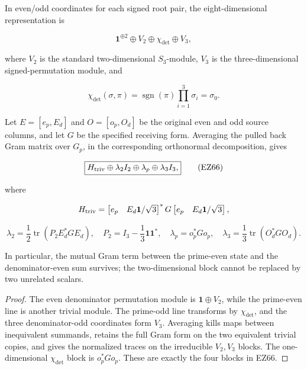 \begin{corollary}
\label{cor:fixed-input-metric}
In even/odd coordinates for each signed root pair, the eight-dimensional
representation is

\begin{equation}
 \mathbf1^{\oplus2}\oplus V_2\oplus\chi_{\det}\oplus V_3,       \tag{EZ65}
\end{equation}

where \(V_2\) is the standard two-dimensional \(S_3\)-module,
\(V_3\) is the three-dimensional signed-permutation module, and

\[
 \chi_{\det}(\sigma,\pi)
 =\operatorname{sgn}(\pi)\prod_{i=1}^3\sigma_i=\sigma_0.
\]

Let \(E=[e_p,E_d]\) and \(O=[o_p,O_d]\) be the original even and odd source
columns, and let \(G\) be the specified receiving form.  Averaging the pulled
back Gram matrix over \(G_p\), in the corresponding orthonormal decomposition,
gives

\begin{equation}
 \boxed{H_{\rm triv}\oplus\lambda_2I_2\oplus\lambda_p
 \oplus\lambda_3I_3,}                                \tag{EZ66}
\end{equation}

where

\[
 H_{\rm triv}=
 \begin{bmatrix}e_p&E_d\mathbf1/\sqrt3\end{bmatrix}^{*}G
 \begin{bmatrix}e_p&E_d\mathbf1/\sqrt3\end{bmatrix},
\]

\[
 \lambda_2=\frac12\operatorname{tr}(P_2E_d^*GE_d),
 \quad P_2=I_3-\frac13\mathbf1\mathbf1^*,
 \quad\lambda_p=o_p^*Go_p,
 \quad\lambda_3=\frac13\operatorname{tr}(O_d^*GO_d).
\]

In particular, the mutual Gram term between the prime-even state and the
denominator-even sum survives; the two-dimensional block cannot be replaced
by two unrelated scalars.
\end{corollary}

\begin{proof}
The even denominator permutation module is
\(\mathbf1\oplus V_2\), while the prime-even line is another trivial module.
The prime-odd line transforms by \(\chi_{\det}\), and the three denominator-odd
coordinates form \(V_3\).  Averaging kills maps between inequivalent
summands, retains the full Gram form on the two equivalent trivial copies,
and gives the normalized traces on the irreducible \(V_2,V_3\) blocks.  The
one-dimensional \(\chi_{\det}\) block is \(o_p^*Go_p\).  These are exactly the
four blocks in EZ66.
\end{proof}

